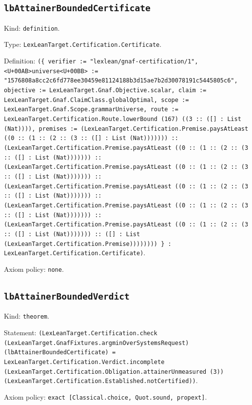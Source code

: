 \documentclass[11pt]{article}
\begin{document}
\subsection*{\texttt{lbAttainerBoundedCertificate}}
\noindent Kind: \texttt{definition}.\par
\noindent Type: \texttt{LexLeanTarget.Certification.Certificate}.\par
\noindent Definition: \texttt{(\{ verifier := "lexlean/gnaf-certification/1", <U+00AB>universe<U+00BB> := "1576808a8cc2c6fd778ee30459e81124188b3d15ae7b2d30078191c5445805c6", objective := LexLeanTarget.Gnaf.Objective.scalar, claim := LexLeanTarget.Gnaf.ClaimClass.globalOptimal, scope := LexLeanTarget.Gnaf.Scope.grammarUniverse, route := LexLeanTarget.Certification.Route.lowerBound (167) ((3 :: ([] : List (Nat)))), premises := (LexLeanTarget.Certification.Premise.paysAtLeast ((0 :: (1 :: (2 :: (3 :: ([] : List (Nat))))))) :: (LexLeanTarget.Certification.Premise.paysAtLeast ((0 :: (1 :: (2 :: (3 :: ([] : List (Nat))))))) :: (LexLeanTarget.Certification.Premise.paysAtLeast ((0 :: (1 :: (2 :: (3 :: ([] : List (Nat))))))) :: (LexLeanTarget.Certification.Premise.paysAtLeast ((0 :: (1 :: (2 :: (3 :: ([] : List (Nat))))))) :: (LexLeanTarget.Certification.Premise.paysAtLeast ((0 :: (1 :: (2 :: (3 :: ([] : List (Nat))))))) :: (LexLeanTarget.Certification.Premise.paysAtLeast ((0 :: (1 :: (2 :: (3 :: ([] : List (Nat))))))) :: ([] : List (LexLeanTarget.Certification.Premise)))))))) \} : LexLeanTarget.Certification.Certificate)}.\par
\noindent Axiom policy: \texttt{none}.\par
\subsection*{\texttt{lbAttainerBoundedVerdict}}
\noindent Kind: \texttt{theorem}.\par
\noindent Statement: \texttt{(LexLeanTarget.Certification.check (LexLeanTarget.GnafFixtures.argminOverSystemsRequest) (lbAttainerBoundedCertificate) = LexLeanTarget.Certification.Verdict.incomplete (LexLeanTarget.Certification.Obligation.attainerUnmeasured (3)) (LexLeanTarget.Certification.Established.notCertified))}.\par
\noindent Axiom policy: \texttt{exact [Classical.choice, Quot.sound, propext]}.\par
\end{document}

